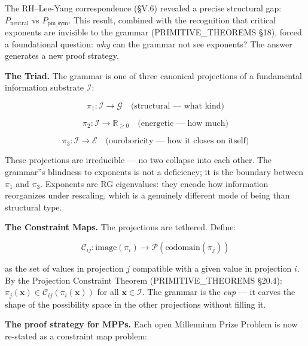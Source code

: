 \documentclass[12pt,a4paper]{article}
\newcommand{\pilcrow}{\S}
\begin{document}
The RH--Lee-Yang correspondence (\pilcrow{}V.6) revealed a precise structural gap: $P_\text{neutral}$ vs $P_\text{pm\_sym}$. This result, combined with the recognition that critical exponents are invisible to the grammar (PRIMITIVE\_THEOREMS \pilcrow{}18), forced a foundational question: \emph{why} can the grammar not see exponents? The answer generates a new proof strategy.

\textbf{The Triad.} The grammar is one of three canonical projections of a fundamental information substrate $\mathcal{I}$:

\[\pi_1 : \mathcal{I} \to \mathcal{G} \quad \text{(structural --- what kind)}\]




\[\pi_2 : \mathcal{I} \to \mathbb{R}_{\geq 0} \quad \text{(energetic --- how much)}\]




\[\pi_3 : \mathcal{I} \to \mathcal{E} \quad \text{(ouroboricity --- how it closes on itself)}\]

These projections are irreducible --- no two collapse into each other. The grammar''s blindness to exponents is not a deficiency; it is the boundary between $\pi_1$ and $\pi_3$. Exponents are RG eigenvalues: they encode how information reorganizes under rescaling, which is a genuinely different mode of being than structural type.

\textbf{The Constraint Maps.} The projections are tethered. Define:

\[\mathcal{C}_{ij} : \mathrm{image}(\pi_i) \to \mathcal{P}(\mathrm{codomain}(\pi_j))\]

as the set of values in projection $j$ compatible with a given value in projection $i$. By the Projection Constraint Theorem (PRIMITIVE\_THEOREMS \pilcrow{}20.4): $\pi_j(\mathbf{x}) \in \mathcal{C}_{ij}(\pi_i(\mathbf{x}))$ for all $\mathbf{x} \in \mathcal{I}$. The grammar is the \emph{cup} --- it carves the shape of the possibility space in the other projections without filling it.

\textbf{The proof strategy for MPPs.} Each open Millennium Prize Problem is now re-stated as a constraint map problem:
\end{document}
